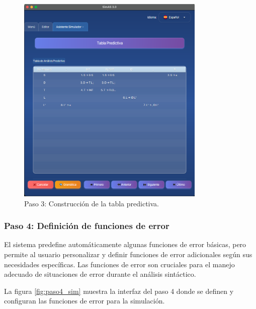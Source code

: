 \needspace{6cm}
\begin{figure}[H]
\centering
\includegraphics[width=0.8\textwidth]{figuras2/simulador/paso3_tablaPredictiva.png}
\caption{Paso 3: Construcción de la tabla predictiva.}
\label{fig:paso3_sim}
\end{figure}

\subsubsection{Paso 4: Definición de funciones de error}

El sistema predefine automáticamente algunas funciones de error básicas, pero permite al usuario personalizar y definir funciones de error adicionales según sus necesidades específicas. Las funciones de error son cruciales para el manejo adecuado de situaciones de error durante el análisis sintáctico.

La figura \ref{fig:paso4_sim} muestra la interfaz del paso 4 donde se definen y configuran las funciones de error para la simulación.

